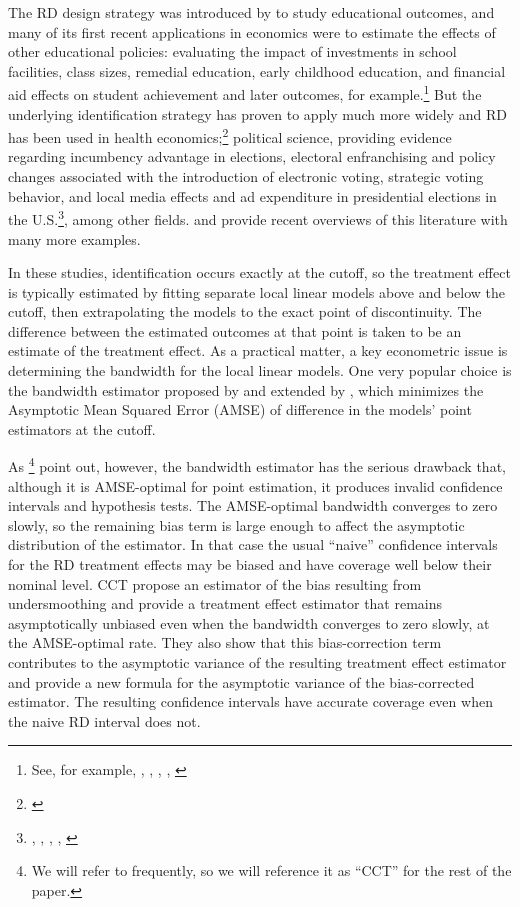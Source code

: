 \documentclass[12pt,fleqn]{article}
\begin{document}
The RD design strategy was introduced by \cite{thistlethwaite1960} to study
educational outcomes, and many of its first recent applications in economics
were to estimate the effects of other educational policies: evaluating the
impact of investments in school facilities, class sizes, remedial education,
early childhood education, and financial aid effects on student achievement and
later outcomes, for example.\footnote{%
  See, for example, \cite{vdk2002}, \cite{jacoblefgren2004}, \cite{ludwig2007},
  \cite{urquiola2009}, \cite{cellini2010}} %
But the underlying identification strategy has proven to apply much more widely
and RD has been used in health economics;\footnote{%
  \cite{Card2009,barreca2011saving}} %
political science, providing evidence regarding incumbency advantage in
elections, electoral enfranchising and policy changes associated with the
introduction of electronic voting, strategic voting behavior, and local media
effects and ad expenditure in presidential elections in the U.S.\footnote{%
  \cite{lee2008}, \cite{caughey2011elections}, \cite{keele2014geographic},
  \cite{erikson2015}, \cite{Fujiwara2011,Fujiwara2015}}, %
among other fields. \cite{imbens2008} and \cite{lee2010} provide recent
overviews of this literature with many more examples.

In these studies, identification occurs exactly at the cutoff, so the
treatment effect is typically estimated by fitting separate local linear models
above and below the cutoff, then extrapolating the models to the exact point of
discontinuity. The difference between the estimated outcomes at that point is
taken to be an estimate of the treatment effect. As a practical matter, a key
econometric issue is determining the bandwidth for the local linear models.  One
very popular choice is the bandwidth estimator proposed by \cite{IK} and
extended by \cite{calonico2014}, which minimizes the Asymptotic Mean Squared
Error (AMSE) of difference in the models' point estimators at the cutoff.

As \cite{calonico2014}\footnote{%
  We will refer to \cite{calonico2014} frequently, so we will reference it as
  ``CCT'' for the rest of the paper.} %
point out, however, the \cite{IK} bandwidth estimator has the serious drawback
that, although it is AMSE-optimal for point estimation, it produces invalid
confidence intervals and hypothesis tests. The AMSE-optimal bandwidth
converges to zero slowly, so the remaining bias term is large enough to affect
the asymptotic distribution of the estimator. In that case the usual ``naive''
confidence intervals for the RD treatment effects may be biased and have
coverage well below their nominal level.
CCT propose an estimator of the bias resulting from undersmoothing and provide a
treatment effect estimator that remains asymptotically unbiased even when the
bandwidth converges to zero slowly, at the AMSE-optimal rate. They also show
that this bias-correction term contributes to the asymptotic variance of the
resulting treatment effect estimator and provide a new formula for the
asymptotic variance of the bias-corrected estimator. The resulting confidence
intervals have accurate coverage even when the naive RD interval does not.
\end{document}
